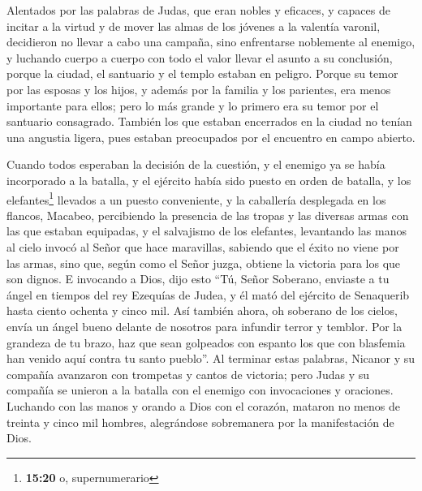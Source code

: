  Alentados por las palabras de Judas, que eran nobles y
eficaces, y capaces de incitar a la virtud y de mover las almas de los
jóvenes a la valentía varonil, decidieron no llevar a cabo una campaña,
sino enfrentarse noblemente al enemigo, y luchando cuerpo a cuerpo con
todo el valor llevar el asunto a su conclusión, porque la ciudad, el
santuario y el templo estaban en peligro.  Porque su
temor por las esposas y los hijos, y además por la familia y los
parientes, era menos importante para ellos; pero lo más grande y lo
primero era su temor por el santuario consagrado. 
También los que estaban encerrados en la ciudad no tenían una angustia
ligera, pues estaban preocupados por el encuentro en campo abierto.

 Cuando todos esperaban la decisión de la cuestión, y el
enemigo ya se había incorporado a la batalla, y el ejército había sido
puesto en orden de batalla, y los elefantes\footnote{\textbf{15:20} o,
  supernumerario} llevados a un puesto conveniente, y la caballería
desplegada en los flancos,  Macabeo, percibiendo la
presencia de las tropas y las diversas armas con las que estaban
equipadas, y el salvajismo de los elefantes, levantando las manos al
cielo invocó al Señor que hace maravillas, sabiendo que el éxito no
viene por las armas, sino que, según como el Señor juzga, obtiene la
victoria para los que son dignos.  E invocando a Dios,
dijo esto ``Tú, Señor Soberano, enviaste a tu ángel en tiempos del rey
Ezequías de Judea, y él mató del ejército de Senaquerib hasta ciento
ochenta y cinco mil.  Así también ahora, oh soberano de
los cielos, envía un ángel bueno delante de nosotros para infundir
terror y temblor.  Por la grandeza de tu brazo, haz que
sean golpeados con espanto los que con blasfemia han venido aquí contra
tu santo pueblo''. Al terminar estas palabras,  Nicanor y
su compañía avanzaron con trompetas y cantos de victoria;
 pero Judas y su compañía se unieron a la batalla con el
enemigo con invocaciones y oraciones.  Luchando con las
manos y orando a Dios con el corazón, mataron no menos de treinta y
cinco mil hombres, alegrándose sobremanera por la manifestación de Dios.


